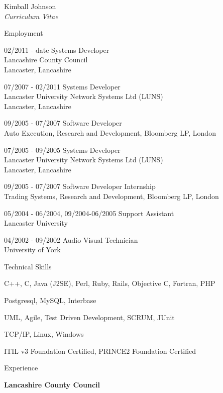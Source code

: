 \documentclass[10pt]{article}
\begin{document}
\begin{cv}{Kimball Johnson\\{\large \itshape Curriculum Vitae}}
\begin{cvlist}{Employment}
    \item[02/2011 - date] Systems Developer\\
    Lancashire County Council\\
    Lancaster, Lancashire
	\item[07/2007 - 02/2011] Systems Developer\\
	Lancaster University Network Systems Ltd (LUNS)\\
	Lancaster, Lancashire
    \item[09/2005 - 07/2007] Software Developer \\
    Auto Execution, Research and Development, Bloomberg LP,
    London
    \item[07/2005 - 09/2005] Systems Developer \\ 
	Lancaster University Network Systems Ltd (LUNS)\\
	Lancaster, Lancashire
    \item[09/2005 - 07/2007] Software Developer Internship\\
    Trading Systems, Research and Development, Bloomberg LP,
    London
    \item[05/2004 - 06/2004, 09/2004-06/2005] Support Assistant\\
    Lancaster University
    \item[04/2002 - 09/2002] Audio Visual Technician\\
    University of York
\end{cvlist}
\setlength{\oldcvlabelwidth}{\cvlabelwidth}
\setlength{\cvlabelwidth}{1em}
\begin{cvlist}{Technical Skills}
		\item C++, C, Java (J2SE), Perl, Ruby, Rails, Objective C, Fortran, PHP
		\item Postgresql, MySQL, Interbase
		\item UML, Agile, Test Driven Development, SCRUM, JUnit
		\item TCP/IP, Linux, Windows
		\item ITIL v3 Foundation Certified, PRINCE2 Foundation Certified
\end{cvlist}
\setlength{\cvlabelwidth}{\oldcvlabelwidth}
\pagebreak

\setlength{\oldcvlabelwidth}{\cvlabelwidth}
\setlength{\cvlabelwidth}{1em}
\renewcommand*{\bibindent}{1.5em}

\begin{cvlist}{Experience}
    \item \textbf{Lancashire County Council}


\end{cvlist}
\end{cv}
\end{document}
